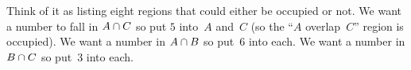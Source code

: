 \documentclass{test}  %
\begin{document}
\begin{problem}
\begin{exes}
\begin{answer}
\begin{center}
\begin{tabular}{ccc|c}
    \end{tabular}
  \end{center}
  Think of it as listing eight regions that could either be occupied or not.
  We want a number to fall in $A\cap C$ so put
  $5$ into~$A$ and~$C$ (so the ``$A$ overlap~$C$'' region is occupied).
  We want a number in $A\cap B$ so put~$6$ into each.
  We want a number in $B\cap C$ so put~$3$ into each.  
\end{answer}
\end{exes}
\end{problem}
\end{document}
